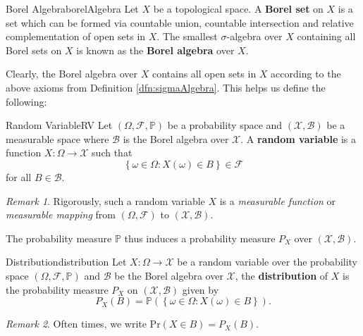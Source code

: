 \documentclass[math]{amznotes}
\theoremstyle{remark}
\newtheorem*{remark}{Remark}
\begin{document}
\begin{dfnbox}{Borel Algebra}{borelAlgebra}
    Let $X$ be a topological space. A {\color{red} \textbf{Borel set}} on $X$ is a set which can be formed via countable union, countable intersection and relative complementation of open sets in $X$. The smallest $\sigma$-algebra over $X$ containing all Borel sets on $X$ is known as the {\color{red} \textbf{Borel algebra}} over $X$.
\end{dfnbox}
Clearly, the Borel algebra over $X$ contains all open sets in $X$ according to the above axioms from Definition \ref{dfn:sigmaAlgebra}. This helps us define the following:
\begin{dfnbox}{Random Variable}{RV}
    Let $\left(\Omega, \mathcal{F}, \mathbb{P}\right)$ be a probability space and $\left(\mathcal{X}, \mathcal{B}\right)$ be a measurable space where $\mathcal{B}$ is the Borel algebra over $\mathcal{X}$. A {\color{red} \textbf{random variable}} is a function $X \colon \Omega \to \mathcal{X}$ such that 
    \begin{equation*}
        \left\{\omega \in \Omega \colon X\left(\omega\right) \in B\right\} \in \mathcal{F} 
    \end{equation*}
    for all $B \in \mathcal{B}$.
\end{dfnbox}
\begin{notebox}
    \begin{remark}
        Rigorously, such a random variable $X$ is a \textit{measurable function} or \textit{measurable mapping} from $\left(\Omega, \mathcal{F}\right)$ to $\left(\mathcal{X}, \mathcal{B}\right)$.
    \end{remark}
\end{notebox}
The probability measure $\mathbb{P}$ thus induces a probability measure $P_X$ over $\left(\mathcal{X}, \mathcal{B}\right)$.
\begin{dfnbox}{Distribution}{distribution}
    Let $X \colon \Omega \to \mathcal{X}$ be a random variable over the probability space $\left(\Omega, \mathcal{F}, \mathbb{P}\right)$ and $\mathcal{B}$ be the Borel algebra over $\mathcal{X}$, the {\color{red} \textbf{distribution}} of $X$ is the probability measure $P_X$ on $\left(\mathcal{X}, \mathcal{B}\right)$ given by 
    \begin{equation*}
        P_X\left(B\right) = \mathbb{P}\left(\left\{\omega \in \Omega \colon X\left(\omega\right) \in B\right\}\right).
    \end{equation*}
\end{dfnbox}
\begin{notebox}
    \begin{remark}
        Often times, we write $\mathrm{Pr}\left(X \in B\right) = P_X\left(B\right)$.
    \end{remark}
\end{notebox}
\end{document}
